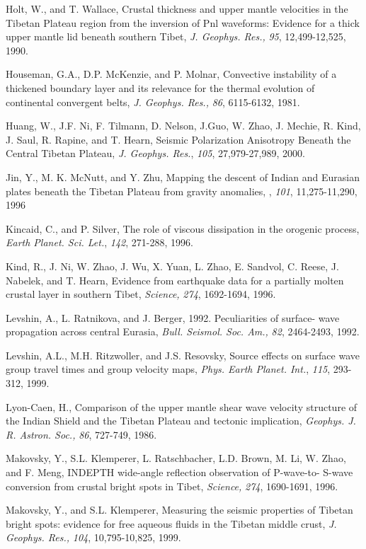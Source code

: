 \documentclass[12pt]{article}
\begin{document}
\begin{references}
Holt, W., and T. Wallace, Crustal thickness and upper mantle velocities
in the Tibetan Plateau region from the inversion of Pnl waveforms: Evidence
for a thick upper mantle lid beneath southern Tibet, {\it J. Geophys. Res.,} 
{\it 95}, 12,499-12,525, 1990.

Houseman, G.A., D.P. McKenzie, and P. Molnar, Convective instability
of a thickened boundary layer and its relevance for the thermal evolution of
continental convergent belts, {\it J. Geophys. Res.,} {\it 86}, 6115-6132, 1981.

Huang, W., J.F. Ni, F. Tilmann, D. Nelson, J.Guo, W. Zhao, J. Mechie,
R. Kind, J. Saul, R. Rapine, and T. Hearn, Seismic Polarization 
Anisotropy Beneath the Central Tibetan Plateau, {\it J. Geophys. Res.},
{\it 105}, 27,979-27,989, 2000.

Jin, Y., M. K. McNutt, and Y. Zhu, Mapping the descent of Indian and
Eurasian plates beneath the Tibetan Plateau from gravity anomalies,
\jgr, {\it 101}, 11,275-11,290, 1996

Kincaid, C., and P. Silver, The role of viscous dissipation in the orogenic
process, {\it Earth Planet. Sci. Let.}, {\it 142}, 271-288, 1996.

Kind, R., J. Ni, W. Zhao, J. Wu, X. Yuan, L. Zhao, E. Sandvol, C. Reese,
J. Nabelek, and T. Hearn, Evidence from earthquake data for a partially
molten crustal layer in southern Tibet, {\it Science,} {\it 274}, 1692-1694,
1996.

Levshin, A., L. Ratnikova, and J. Berger, 1992. Peculiarities of surface-
wave propagation across central Eurasia, {\it Bull. Seismol. Soc. Am.,}
{\it 82}, 2464-2493, 1992.

Levshin, A.L., M.H. Ritzwoller, and J.S. Resovsky, Source effects on
surface wave group travel times and group velocity maps, {\it Phys.
Earth Planet. Int.}, {\it 115}, 293-312, 1999.

Lyon-Caen, H., Comparison of the upper mantle shear wave velocity
structure of the Indian Shield and the Tibetan Plateau and tectonic
implication, {\it Geophys. J. R. Astron. Soc.,} {\it 86}, 727-749, 1986.

Makovsky, Y., S.L. Klemperer, L. Ratschbacher, L.D. Brown, M. Li, W. Zhao,
and F. Meng, INDEPTH wide-angle reflection observation of P-wave-to-
S-wave conversion from crustal bright spots in Tibet, {\it Science,} {\it 274},
1690-1691, 1996.

Makovsky, Y., and S.L. Klemperer, Measuring the seismic properties
of Tibetan bright spots: evidence for free aqueous fluids in the Tibetan
middle crust, {\it J. Geophys. Res.,} {\it 104}, 10,795-10,825, 1999.


\end{references}
\end{document}
